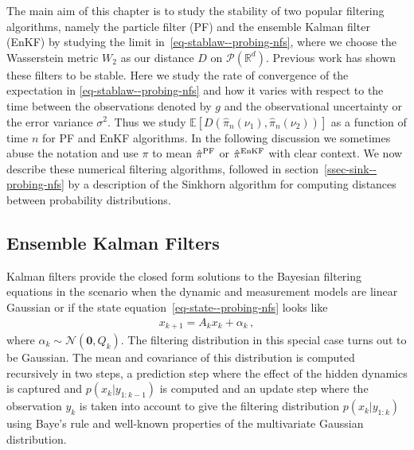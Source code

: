 The main aim of this chapter is to study the stability of two popular filtering algorithms, namely the particle filter (PF) and the ensemble Kalman filter (EnKF) by studying the limit in~\eqref{eq-stablaw--probing-nfs}, where we choose the Wasserstein metric $W_2$ as our distance $D$ on $\mathcal P(\mathbb R^d)$. Previous work \cite{mandal2021stability} has shown these filters to be stable. Here we study the rate of convergence of the expectation in \eqref{eq-stablaw--probing-nfs} and how it varies with respect to the time between the observations denoted by $g$ and the observational uncertainty or the error variance $\sigma^2$. Thus we study $\mathbb{E}[D(\hat{\pi}_n(\nu_1), \hat{\pi}_n(\nu_2))]$ as a function of time $n$ for PF and EnKF algorithms. {\color{mypink}In the following discussion we sometimes abuse the notation and use $\pi$ to mean $\hat \pi^{\rm PF}$ or $\hat \pi^{\rm EnKF}$ with clear context.} We now describe these numerical filtering algorithms, followed in section~\ref{ssec-sink--probing-nfs} by a description of the Sinkhorn algorithm for computing distances between probability distributions.

\subsection{Ensemble Kalman Filters}\label{ssec-enkf--probing-nfs}
Kalman filters provide the closed form solutions to the Bayesian filtering equations in the scenario when the dynamic and measurement models are linear Gaussian or if the state equation~\eqref{eq-state--probing-nfs} looks like 
\begin{align}
   x_{k+1}=A_k x_k + \alpha_k \,, \label{eq-state-linear--probing-nfs} 
\end{align}
where $\alpha_k\sim\mathcal N(\mathbf{0},Q_k)$. The filtering distribution in this special case turns out to be Gaussian. The mean and covariance of this distribution is computed recursively in two steps, a prediction step where the effect of the hidden dynamics is captured and $p(x_k|y_{1:k-1})$ is computed and an update step where the observation $y_k$ is taken into account to give the filtering distribution $p(x_k|y_{1:k})$ using Baye's rule and well-known properties of the multivariate Gaussian distribution.

